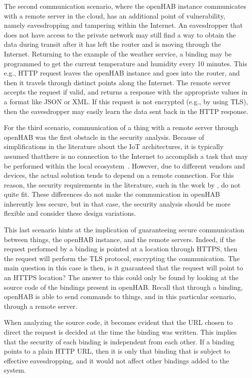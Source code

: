 \documentclass[12pt]{article}
\begin{document}
The second communication scenario, where the openHAB instance communicates with a remote server in the cloud, has an additional point of vulnerability, namely eavesdropping and tampering within the Internet. An eavesdropper that does not have access to the private network may still find a way to obtain the data during transit after it has left the router and is moving through the Internet. Returning to the example of the weather service, a binding may be programmed to get the current temperature and humidity every 10 minutes. This e.g., HTTP request leaves the openHAB instance and goes into the router, and then it travels through distinct points along the Internet. The remote server accepts the request if valid, and returns a response with the appropriate values in a format like JSON or XML. If this request is not encrypted (e.g., by using TLS), then the eavesdropper may easily learn the data sent back in the HTTP response.

For the third scenario, communication of a thing with a remote server through openHAB was the first obstacle in the security analysis. Because of simplifications in the literature about the IoT architectures, it is typically assumed thatthere is no connection to the Internet to accomplish a task that may be performed within the local ecosystem~\cite{ALABA201710}. However, due to different vendors and devices, the actual solution tends to depend on a remote connection. For this reason, the security requirements in the literature, such in the work by \citet{taekim}, do not quite fit. These differences do not make the communication in openHAB inherently less secure, but in that case, the security analysis should be more flexible and consider these design variations. 

This last scenario hints at the implication of guaranteeing secure communication between things, the openHAB instance, and the remote servers. Indeed, if the request performed by a binding is pointed at a location through HTTPS, then the request will perform the TLS protocol, encrypting the communication. The main question in this case is then, is it guaranteed that the request will point to an HTTPS location? The answer to this could only be found by looking at the source code of the bindings present in openHAB. Recall that through a binding, openHAB is able to send commands to things, and in this particular scenario, through a remote server.

When analyzing the source code, it becomes evident that the URL chosen to direct the request is decided at the time the binding was written. This implies that the security of each binding is independent from each other. If a binding points to a plain HTTP URL, then it is only that binding that is subject to effective eavesdropping, and it would not affect other bindings added to the system.
\end{document}
